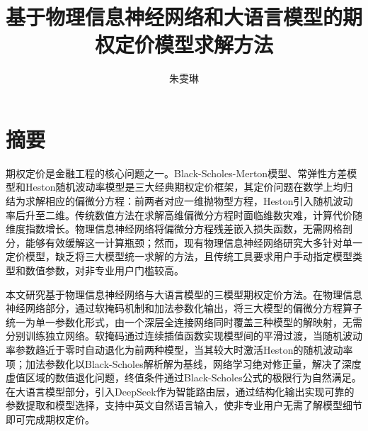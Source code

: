 \confidential{}
\title{基于物理信息神经网络和大语言模型的期权定价模型求解方法}
\author{朱雯琳}
\advisorsec{}

\chapter*{摘\quad 要}
\setcounter{page}{1}

期权定价是金融工程的核心问题之一。Black-Scholes-Merton模型、常弹性方差模型和Heston随机波动率模型是三大经典期权定价框架，其定价问题在数学上均归结为求解相应的偏微分方程：前两者对应一维抛物型方程，Heston引入随机波动率后升至二维。传统数值方法在求解高维偏微分方程时面临维数灾难，计算代价随维度指数增长。物理信息神经网络将偏微分方程残差嵌入损失函数，无需网格剖分，能够有效缓解这一计算瓶颈；然而，现有物理信息神经网络研究大多针对单一定价模型，缺乏将三大模型统一求解的方法，且传统工具要求用户手动指定模型类型和数值参数，对非专业用户门槛较高。

本文研究基于物理信息神经网络与大语言模型的三模型期权定价方法。在物理信息神经网络部分，通过软掩码机制和加法参数化输出，将三大模型的偏微分方程算子统一为单一参数化形式，由一个深层全连接网络同时覆盖三种模型的解映射，无需分别训练独立网络。软掩码通过连续插值函数实现模型间的平滑过渡，当随机波动率参数趋近于零时自动退化为前两种模型，当其较大时激活Heston的随机波动率项；加法参数化以Black-Scholes解析解为基线，网络学习绝对修正量，解决了深度虚值区域的数值退化问题，终值条件通过Black-Scholes公式的极限行为自然满足。在大语言模型部分，引入DeepSeek作为智能路由层，通过结构化输出实现可靠的参数提取和模型选择，支持中英文自然语言输入，使非专业用户无需了解模型细节即可完成期权定价。

